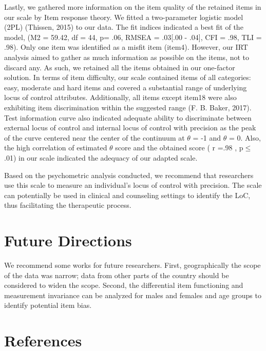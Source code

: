 \documentclass[
  english,
  man]{apa6}
\begin{document}
Lastly, we gathered more information on the item quality of the retained items in our scale by Item response theory. We fitted a two-parameter logistic model (2PL) (Thissen, 2015) to our data. The fit indices indicated a best fit of the model, (M2 = 59.42, df = 44, p= .06, RMSEA = .03{[}.00 - .04{]}, CFI = .98, TLI = .98). Only one item was identified as a misfit item (item4). However, our IRT analysis aimed to gather as much information as possible on the items, not to discard any. As such, we retained all the items obtained in our one-factor solution. In terms of item difficulty, our scale contained items of all categories: easy, moderate and hard items and covered a substantial range of underlying locus of control attributes. Additionally, all items except item18 were also exhibiting item discrimination within the suggested range (F. B. Baker, 2017). Test information curve also indicated adequate ability to discriminate between external locus of control and internal locus of control with precision as the peak of the curve centered near the center of the continuum at \(\theta\) = -1 and \(\theta\) = 0. Also, the high correlation of estimated \(\theta\) score and the obtained score ( r =.98 , p\(\le\).01) in our scale indicated the adequacy of our adapted scale.

Based on the psychometric analysis conducted, we recommend that researchers use this scale to measure an individual's locus of control with precision. The scale can potentially be used in clinical and counseling settings to identify the LoC, thus facilitating the therapeutic process.

\hypertarget{future-directions}{%
\section{Future Directions}\label{future-directions}}

We recommend some works for future researchers. First, geographically the scope of the data was narrow; data from other parts of the country should be considered to widen the scope. Second, the differential item functioning and measurement invariance can be analyzed for males and females and age groups to identify potential item bias.

\newpage

\hypertarget{references}{%
\section{References}\label{references}}
\end{document}
